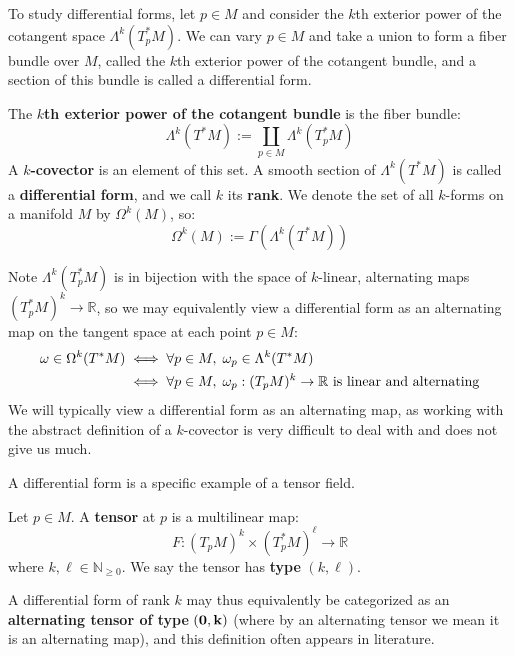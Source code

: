 To study differential forms, let $p\in M$ and consider the $k$th exterior power of the cotangent space $\Lambda^k(T_p^* M)$. 
We can vary $p\in M$ and take a union to form a fiber bundle over $M$, called the $k$th exterior power of the cotangent 
bundle, and a section of this bundle is called a differential form.
\begin{definition}
	The \textbf{$k$th exterior power of the cotangent bundle} is the fiber bundle:
	\begin{equation}
		\Lambda^k(T^* M) := \coprod_{p\in M}\Lambda^k(T_p^* M)
	\end{equation}
	A \textbf{$k$-covector} is an element of this set. A smooth section of $\Lambda^k(T^* M)$ is called a \textbf{differential 
	form}, and we call $k$ its \textbf{rank}. We denote the set of all $k$-forms on a manifold $M$ by $\Omega^k(M)$, so:
	\begin{equation}
		\Omega^k(M) := \Gamma\left(\Lambda^k(T^* M)\right)
	\end{equation}
\end{definition}
Note $\Lambda^k(T_p^* M)$ is in bijection with the space of $k$-linear, alternating maps $(T_p^* M)^k\rightarrow\mathbb R$, 
so we may equivalently view a differential form as an alternating map on the tangent space at each point $p\in M$:
\begin{align}
	\omega\in\Omega^k(T^*M) &\iff\forall p\in M, \;\omega_p\in\Lambda^k(T^*M) \\
	&\iff\forall p\in M, \;\omega_p : (T_p M)^k\rightarrow \mathbb R\textnormal{ is linear and alternating}
\end{align}
We will typically view a differential form as an alternating map, as working with the abstract definition of a $k$-covector 
is very difficult to deal with and does not give us much. 

A differential form is a specific example of a tensor field.
\begin{definition}[Tensor]
	Let $p\in M$. A \textbf{tensor} at $p$ is a multilinear map:
	\begin{equation}
		F : (T_p M)^k\times (T_p^* M)^\ell\rightarrow\mathbb R
	\end{equation}
	where $k, \ell\in\mathbb N_{\geq 0}$. We say the tensor has \textbf{type} $(k, \ell)$. 
\end{definition}
A differential form of rank $k$ may thus equivalently be categorized as an \textbf{alternating tensor of type} $\bf{(0, k)}$ (where 
by an alternating tensor we mean it is an alternating map), and this definition often appears in literature. 

